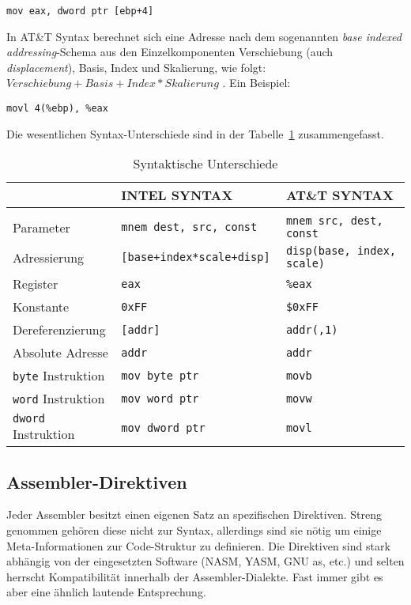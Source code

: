 \hspace{5mm} 
\texttt{mov eax, dword ptr [ebp+4]}

In AT\&T Syntax berechnet sich eine Adresse nach dem sogenannten \emph{base
indexed addressing}-Schema aus den Einzelkomponenten Verschiebung (auch
\emph{displacement}), Basis, Index und Skalierung, wie folgt: $Verschiebung + Basis +
Index*Skalierung$ . Ein Beispiel:

\hspace{5mm} 
\texttt{movl 4(\%ebp), \%eax}

Die wesentlichen Syntax-Unterschiede sind in der Tabelle~\ref{tab:syntaxdiffs}
zusammengefasst.


\begin{table}[h]	%
\begin{tabular}{lll}
\\	                          & INTEL SYNTAX                  & AT\&T SYNTAX
\\\hline
\\	Parameter 								& \tt mnem dest, src, const  	  & \tt mnem src, dest, const
\\  Adressierung  				  	&	\tt [base+index*scale+disp]   & \tt disp(base, index, scale)
\\	Register      						& \tt eax              					& \tt \%eax
\\	Konstante     						& \tt 0xFF             					& \tt \$0xFF
\\	Dereferenzierung   				& \tt [addr]           					& \tt addr(,1)
\\	Absolute Adresse 			 	  & \tt addr             					& \tt *addr
\\	{\tt byte} Instruktion    & \tt mov byte ptr     					& \tt movb
\\	{\tt word} Instruktion    & \tt mov word ptr     					& \tt movw
\\  {\tt dword} Instruktion   & \tt mov dword ptr    					& \tt movl
\end{tabular}
\caption{Syntaktische Unterschiede} \label{tab:syntaxdiffs}
\end{table}

\subsection{Assembler-Direktiven}
Jeder Assembler besitzt einen eigenen Satz an spezifischen Direktiven. Streng
genommen gehören diese nicht zur Syntax, allerdings sind sie nötig um einige
Meta-Informationen zur Code-Struktur zu definieren. Die Direktiven sind stark
abhängig von der eingesetzten Software (NASM, YASM, GNU as, etc.) und selten
herrscht Kompatibilität innerhalb der Assembler-Dialekte. Fast immer gibt es aber eine
ähnlich lautende Entsprechung. 

